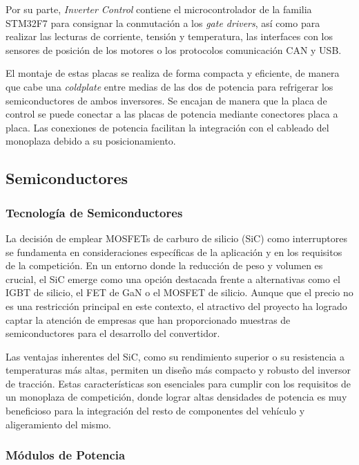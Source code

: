 Por su parte, \textit{Inverter Control} contiene el microcontrolador de la familia STM32F7 para consignar la conmutación a los \textit{gate drivers}, así como para realizar las lecturas de corriente, tensión y temperatura, las interfaces con los sensores de posición de los motores o los protocolos comunicación CAN y USB.

El montaje de estas placas se realiza de forma compacta y eficiente, de manera que cabe una \textit{coldplate} entre medias de las dos de potencia para refrigerar los semiconductores de ambos inversores. Se encajan de manera que la placa de control se puede conectar a las placas de potencia mediante conectores placa a placa. Las conexiones de potencia facilitan la integración con el cableado del monoplaza debido a su posicionamiento.


\subsection{Semiconductores}

\subsubsection{Tecnología de Semiconductores}

La decisión de emplear MOSFETs de carburo de silicio (SiC) como interruptores se fundamenta en consideraciones específicas de la aplicación y en los requisitos de la competición. En un entorno donde la reducción de peso y volumen es crucial, el SiC emerge como una opción destacada frente a alternativas como el IGBT de silicio, el FET de GaN o el MOSFET de silicio. Aunque que el precio no es una restricción principal en este contexto, el atractivo del proyecto ha logrado captar la atención de empresas que han proporcionado muestras de semiconductores para el desarrollo del convertidor.

Las ventajas inherentes del SiC, como su rendimiento superior o su resistencia a temperaturas más altas, permiten un diseño más compacto y robusto del inversor de tracción. Estas características son esenciales para cumplir con los requisitos de un monoplaza de competición, donde lograr altas densidades de potencia es muy beneficioso para la integración del resto de componentes del vehículo y aligeramiento del mismo.

\subsubsection{Módulos de Potencia}


